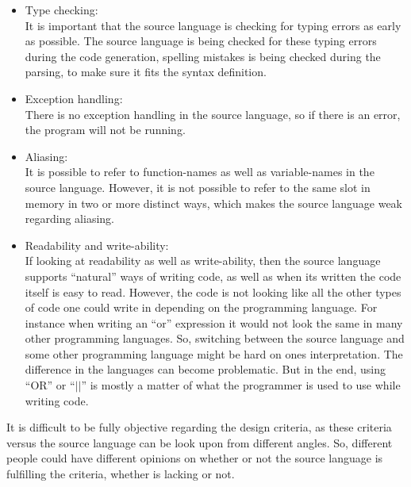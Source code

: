 \begin{itemize}
\item Type checking: \\
It is important that the source language is checking for typing errors as early as possible. The source language is being checked for these typing errors during the code generation, spelling mistakes is being checked during the parsing, to make sure it fits the syntax definition.
\item Exception handling: \\
There is no exception handling in the source language, so if there is an error, the program will not be running.
\item Aliasing: \\
It is possible to refer to function-names as well as variable-names in the source language. However, it is not possible to refer to the same slot in memory in two or more distinct ways, which makes the source language weak regarding aliasing. 
\item Readability and write-ability: \\
If looking at readability as well as write-ability, then the source language supports ``natural'' ways of writing code, as well as when its written the code itself is easy to read. However, the code is not looking like all the other types of code one could write in depending on the programming language. For instance when writing an ``or'' expression it would not look the same in many other programming languages. So, switching between the source language and some other programming language might be hard on ones interpretation. The difference in the languages can become problematic. But in the end, using ``OR'' or ``$||$'' is mostly a matter of what the programmer is used to use while writing code. 
\end{itemize}
It is difficult to be fully objective regarding the design criteria, as these criteria versus the source language can be look upon from different angles. So, different people could have different opinions on whether or not the source language is fulfilling the criteria, whether is lacking or not. 